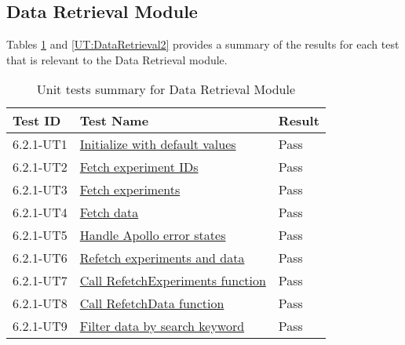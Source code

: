 \documentclass[12pt, titlepage]{article}
\begin{document}
\subsection{Data Retrieval Module}
Tables \ref{UT:DataRetrieval1} and \ref{UT:DataRetrieval2} provides a summary of the results for each test that is
relevant to the Data Retrieval module.
\begin{table}[H]
  \centering
  \begin{tabular}{|l|l|l|}
    \hline
    \textbf{Test ID} & \textbf{Test Name} & \textbf{Result}\\
    \hline
    6.2.1-UT1 & \href{https://github.com/SumanyaG/Alkalytics/blob/main/src/frontend/test/hooks/useTable.test.tsx}{Initialize with default values} & Pass \\
    \hline
    6.2.1-UT2 & \href{https://github.com/SumanyaG/Alkalytics/blob/main/src/frontend/test/hooks/useTable.test.tsx}{Fetch experiment IDs} & Pass \\
    \hline
    6.2.1-UT3 & \href{https://github.com/SumanyaG/Alkalytics/blob/main/src/frontend/test/hooks/useTable.test.tsx}{Fetch experiments} & Pass \\
    \hline
    6.2.1-UT4 & \href{https://github.com/SumanyaG/Alkalytics/blob/main/src/frontend/test/hooks/useTable.test.tsx}{Fetch data} & Pass \\
    \hline
    6.2.1-UT5 & \href{https://github.com/SumanyaG/Alkalytics/blob/main/src/frontend/test/hooks/useTable.test.tsx}{Handle Apollo error states} & Pass \\
    \hline
    6.2.1-UT6 & \href{https://github.com/SumanyaG/Alkalytics/blob/main/src/frontend/test/hooks/useTable.test.tsx}{Refetch experiments and data} & Pass \\
    \hline
    6.2.1-UT7 & \href{https://github.com/SumanyaG/Alkalytics/blob/main/src/frontend/test/hooks/useTable.test.tsx}{Call RefetchExperiments function} & Pass \\
    \hline
    6.2.1-UT8 & \href{https://github.com/SumanyaG/Alkalytics/blob/main/src/frontend/test/hooks/useTable.test.tsx}{Call RefetchData function} & Pass \\
    \hline
    6.2.1-UT9 & \href{https://github.com/SumanyaG/Alkalytics/blob/main/src/frontend/test/hooks/TableHeader.test.tsx}{Filter data by search keyword} & Pass \\
    \hline
  \end{tabular}
  \caption{Unit tests summary for Data Retrieval Module}
  \label{UT:DataRetrieval1}
\end{table}
\end{document}
